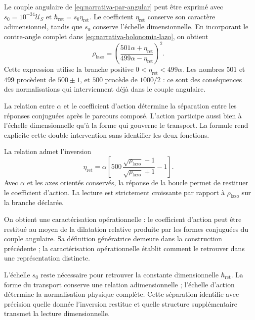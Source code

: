 Le couple angulaire de \eqref{eq:narrativa-par-angular} peut être exprimé avec
$s_0=10^{-34}\mathcal U_S$ et
$\hbar_{\mathrm{ret}}=s_0\eta_{\mathrm{ret}}$. Le coefficient
$\eta_{\mathrm{ret}}$ conserve son caractère adimensionnel, tandis que $s_0$
conserve l’échelle dimensionnelle. En incorporant le contre-angle complet
dans \eqref{eq:narrativa-holonomia-lazo}, on obtient
\begin{equation}
 \boxed{
 \rho_{\mathrm{lazo}}=
 \left(\frac{501\alpha+\eta_{\mathrm{ret}}}
              {499\alpha-\eta_{\mathrm{ret}}}\right)^2.}
 \label{eq:narrativa-lazo-alfa-accion}
\end{equation}
Cette expression utilise la branche positive
$0<\eta_{\mathrm{ret}}<499\alpha$. Les nombres $501$ et $499$ procèdent
de $500\pm1$, et $500$ procède de $1000/2$ : ce sont des conséquences des
normalisations qui interviennent déjà dans le couple angulaire.

La relation entre $\alpha$ et le coefficient d’action détermine la
séparation entre les réponses conjuguées après le parcours
composé. L’action participe aussi bien à l’échelle dimensionnelle qu’à
la forme qui gouverne le transport. La formule rend explicite cette
double intervention sans identifier les deux fonctions.

La relation admet l’inversion
\begin{equation}
 \boxed{
 \eta_{\mathrm{ret}}=
 \alpha\left[
 500\,\frac{\sqrt{\rho_{\mathrm{lazo}}}-1}
               {\sqrt{\rho_{\mathrm{lazo}}}+1}-1\right].}
 \label{eq:narrativa-inversa-accion}
\end{equation}
Avec $\alpha$ et les axes orientés conservés, la réponse de la boucle
permet de restituer le coefficient d’action. La lecture est strictement
croissante par rapport à $\rho_{\mathrm{lazo}}$ sur la branche déclarée.

On obtient une caractérisation opérationnelle : le coefficient d’action
peut être restitué au moyen de la dilatation relative produite par les
formes conjuguées du couple angulaire. Sa définition génératrice demeure
dans la construction précédente ; la caractérisation opérationnelle établit
comment le retrouver dans une représentation distincte.

L’échelle $s_0$ reste nécessaire pour retrouver la constante
dimensionnelle $\hbar_{\mathrm{ret}}$. La forme du transport conserve
une relation adimensionnelle ; l’échelle d’action détermine la
normalisation physique complète. Cette séparation identifie avec précision
quelle donnée l’inversion restitue et quelle structure supplémentaire transmet la
lecture dimensionnelle.

